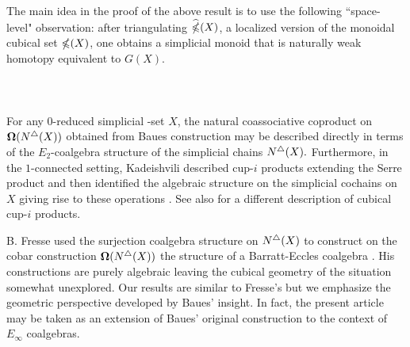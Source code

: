 

The main idea in the proof of the above result is to use the following ``space-level" observation: after triangulating $\widehat{\mathbb{\Omega}}({X})$, a localized version of the monoidal cubical set $\mathbb{\Omega}(X)$, one obtains a simplicial monoid that is naturally weak homotopy equivalent to $G(X).$ 
\\
\\
\\
\\
For any $0$-reduced simplicial -set $X$, the natural coassociative coproduct on $\operatorname{\mathbf{\Omega}} (N^{\triangle} (X))$ obtained from Baues construction may be described directly in terms of the $E_2$-coalgebra structure of the simplicial chains $N^{\triangle}(X).$ Furthermore, in the $1$-connected setting, Kadeishvili described cup-$i$ products extending the Serre product and then identified the algebraic structure on the simplicial cochains on $X$ giving rise to these operations \cite{kadeishvili1999coproducts, kadeishvili2003cup-i}.
See also \cite{pilarczyk2016cubical} for a different description of cubical cup-$i$ products.

B. Fresse used the surjection coalgebra structure on $N^{\triangle}(X)$ to construct on the cobar construction $\operatorname{\mathbf{\Omega}}(N^{\triangle}(X))$ the  structure of a Barratt-Eccles coalgebra \cite{fresse2003hopf}.
His constructions are purely algebraic leaving the cubical geometry of the situation somewhat unexplored.
Our results are similar to Fresse's but we emphasize the geometric perspective developed by Baues' insight.
In fact, the present article may be taken as an extension of Baues' original construction to the context of $E_{\infty}$ coalgebras.

